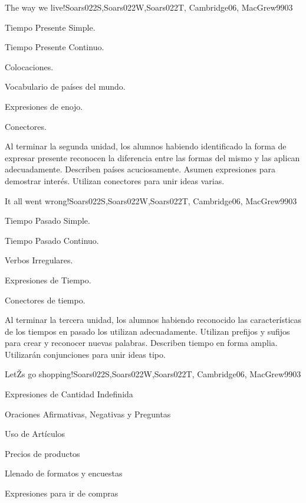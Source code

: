 \begin{syllabus}
\begin{unit}{The way we live!}{Soars022S,Soars022W,Soars022T, Cambridge06, MacGrew99}{0}{3}
   \begin{topics}
      \item Tiempo Presente Simple.
      \item Tiempo Presente Continuo.
      \item Colocaciones.
      \item Vocabulario de países del  mundo.
      \item Expresiones de enojo.
      \item Conectores.
   \end{topics}

   \begin{unitgoals}
      \item Al terminar la segunda unidad, los alumnos habiendo identificado la forma de expresar presente reconocen la diferencia entre las formas del mismo y las aplican adecuadamente. Describen países acuciosamente.  Asumen expresiones para demostrar interés. Utilizan conectores para unir ideas varias.  
   \end{unitgoals}
\end{unit}

\begin{unit}{It all went wrong!}{Soars022S,Soars022W,Soars022T, Cambridge06, MacGrew99}{0}{3}
   \begin{topics}
      \item Tiempo Pasado Simple.
      \item Tiempo Pasado Continuo.
      \item Verbos Irregulares.
      \item Expresiones de Tiempo.
      \item Conectores de tiempo.
   \end{topics}

   \begin{unitgoals}
      \item Al terminar la tercera unidad, los alumnos habiendo reconocido las características de los tiempos en pasado los utilizan adecuadamente. Utilizan prefijos y sufijos para crear y reconocer nuevas palabras. Describen tiempo en forma amplia. Utilizarán conjunciones para unir ideas tipo. 
   \end{unitgoals}
\end{unit}

\begin{unit}{LetŽs go shopping!}{Soars022S,Soars022W,Soars022T, Cambridge06, MacGrew99}{0}{3}
   \begin{topics}
      \item Expresiones de Cantidad Indefinida
      \item Oraciones Afirmativas, Negativas y Preguntas
      \item Uso de Artículos
      \item Precios de productos
      \item Llenado de formatos y encuestas
      \item Expresiones para ir de compras
   \end{topics}


\end{unit}
\end{syllabus}
